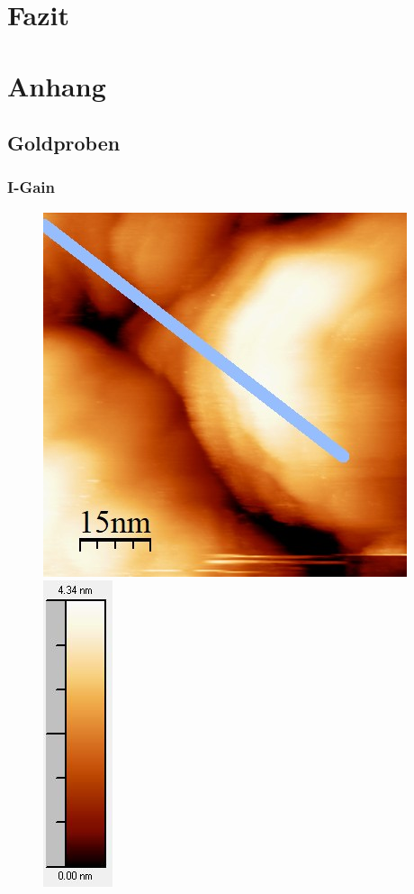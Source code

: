 \documentclass[12pt,a4paper]{article}
\begin{document}
\section{Fazit}

\newpage
\section{Anhang}
\subsection{Goldproben}
\subsubsection{I-Gain}
\begin{figure}
\centering
\includegraphics[scale=0.6]{Bilder/Anhang/IGain/1000_IGain_vor.jpg}
\includegraphics[scale=0.6]{Bilder/Anhang/IGain/1000_IGain_vor_Skala.jpg}

\end{figure}
\end{document}
